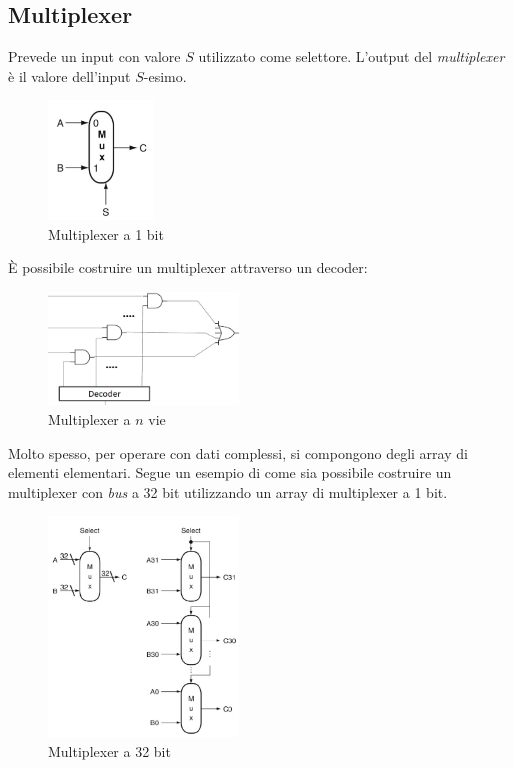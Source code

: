 \documentclass[class=book, crop=false, oneside]{standalone}
\begin{document}
\subsection*{Multiplexer}\label{subsec:multi}
Prevede un input con valore \(S\) utilizzato come selettore. L'output del \emph{multiplexer} è il valore dell'input \(S\)-esimo.
\begin{figure}[H]
	\centering
	\includegraphics[width=0.25\textwidth,keepaspectratio]{multi.png}
	\caption{Multiplexer a 1 bit}
\end{figure}
\`{E} possibile costruire un multiplexer attraverso un decoder:
\begin{figure}[H]
	\centering
	\includegraphics[width=0.45\textwidth,keepaspectratio]{multi_n_vie.png}
	\caption{Multiplexer a $n$ vie}
\end{figure}
Molto spesso, per operare con dati complessi, si compongono degli array di elementi elementari. Segue un esempio di come sia possibile costruire un multiplexer con \emph{bus} a 32 bit utilizzando un array di multiplexer a 1 bit.
\begin{figure}[H]
	\centering
	\includegraphics[width=0.45\textwidth,keepaspectratio]{mux_32bit.png}
	\caption{Multiplexer a 32 bit}
\end{figure}
\end{document}
